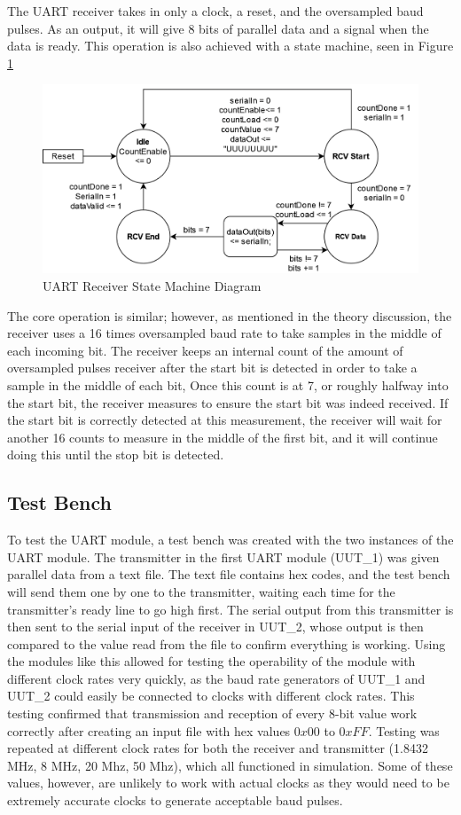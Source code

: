 \documentclass[11pt]{article}
\begin{document}
The UART receiver takes in only a clock, a reset, and the oversampled baud pulses.
As an output, it will give 8 bits of parallel data and a signal when the data is ready.
This operation is also achieved with a state machine, seen in Figure \ref{fig:receivesm}

\begin{figure}[H]        
    \centering
    \includegraphics[width=.5\textwidth]{ReceiverSM.drawio.png}
    \caption{UART Receiver State Machine Diagram}
    \label{fig:receivesm}
\end{figure} 

The core operation is similar; however, as mentioned in the theory discussion, the receiver uses a 16 times oversampled baud rate to take samples in the middle of each incoming bit.
The receiver keeps an internal count of the amount of oversampled pulses receiver after the start bit is detected in order to take a sample in the middle of each bit,
Once this count is at 7, or roughly halfway into the start bit, the receiver measures to ensure the start bit was indeed received.
If the start bit is correctly detected at this measurement, the receiver will wait for another 16 counts to measure in the middle of the first bit, and it will continue doing this until the stop bit is detected.

\subsection{Test Bench}
To test the UART module, a test bench was created with the two instances of the UART module.
The transmitter in the first UART module (UUT\_1) was given parallel data from a text file.
The text file contains hex codes, and the test bench will send them one by one to the transmitter, waiting each time for the transmitter's ready line to go high first.
The serial output from this transmitter is then sent to the serial input of the receiver in UUT\_2, whose output is then compared to the value read from the file to confirm everything is working.
Using the modules like this allowed for testing the operability of the module with different clock rates very quickly, as the baud rate generators of UUT\_1 and UUT\_2 could easily be connected to clocks with different clock rates. 
This testing confirmed that transmission and reception of every 8-bit value work correctly after creating an input file with hex values $0x00$ to $0xFF$. 
Testing was repeated at different clock rates for both the receiver and transmitter (1.8432 MHz, 8 MHz, 20 Mhz, 50 Mhz), which all functioned in simulation.
Some of these values, however, are unlikely to work with actual clocks as they would need to be extremely accurate clocks to generate acceptable baud pulses. 
\end{document}
